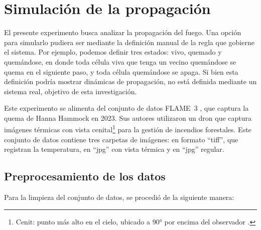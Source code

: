 \section{Simulación de la propagación}

El presente experimento busca analizar la propagación del fuego. Una opción para simularlo pudiera ser mediante la definición manual de la regla que gobierne el sistema. Por ejemplo, podemos definir tres estados: vivo, quemado y quemándose, en donde toda célula viva que tenga un vecino quemándose se quema en el siguiente paso, y toda célula quemándose se apaga. Si bien esta definición podría mostrar dinámicas de propagación, no está definida mediante un sistema real, objetivo de esta investigación.

Este experimento se alimenta del conjunto de datos FLAME~3 \cite{hopkins2024flame3datasetunleashing}, que captura la quema de Hanna Hammock en 2023. Sus autores utilizaron un dron que captura imágenes térmicas con vista cenital\footnote{Cenit: punto más alto en el cielo, ubicado a 90° por encima del observador \cite{plano_cenital}.} para la gestión de incendios forestales. Este conjunto de datos contiene tres carpetas de imágenes: en formato ``tiff'', que registran la temperatura, en ``jpg'' con vista térmica y en ``jpg'' regular.

\subsection{Preprocesamiento de los datos}

Para la limpieza del conjunto de datos, se procedió de la siguiente manera: 

